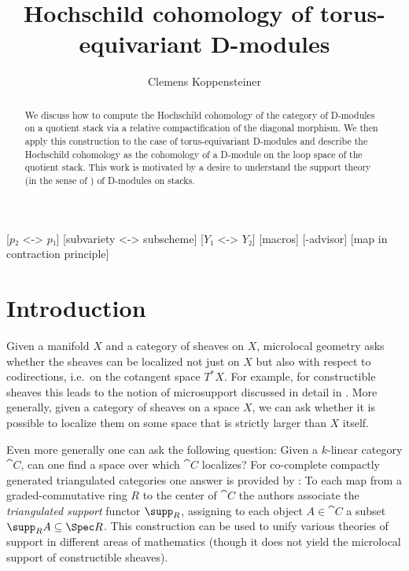 \documentclass[english]{ck-article}
\title{Hochschild cohomology of torus-equivariant D-modules}
\author{Clemens Koppensteiner}
\let\bar\overline
\newcommand\schemei{i'}
\newcommand\schemej{j'}
\newcommand\schemeq{q'}
\newcommand\schemebarq{\bar{q}'}
\newcommand\dropprimes{%
    \renewcommand\schemei{i}%
    \renewcommand\schemej{j}%
    \renewcommand\schemeq{q}%
    \renewcommand\schemebarq{\bar{q}}%
}
\begin{document}
\maketitle

[$p₂$ <-> $p₁$]
[subvariety <-> subscheme]
[$Y₁$ <-> $Y₂$]
\dropprimes%
[macros]
[-advisor]
[map in contraction principle]

\begin{abstract}
    We discuss how to compute the Hochschild cohomology of the category of D-modules on a quotient stack via a relative compactification of the diagonal morphism.
    We then apply this construction to the case of torus-equivariant D-modules and describe the Hochschild cohomology as the cohomology of a D-module on the loop space of the quotient stack.
    This work is motivated by a desire to understand the support theory (in the sense of \cite{BensonIyengarKrause:2008:LocalCohomologyAndSupportForTriangulatedCategories}) of D-modules on stacks.
\end{abstract}

\setcounter{tocdepth}{1}
\tableofcontents

\section{Introduction}

Given a manifold $X$ and a category of sheaves on $X$, microlocal geometry asks whether the sheaves can be localized not just on $X$ but also with respect to codirections, i.e.~on the cotangent space $T^*X$.
For example, for constructible sheaves this leads to the notion of microsupport discussed in detail in \cite{KashiwaraSchapira:1994:SheavesOnManifolds}.
More generally, given a category of sheaves on a space $X$, we can ask whether it is possible to localize them on some space that is strictly larger than $X$ itself.

Even more generally one can ask the following question: Given a $k$-linear category $\cat C$, can one find a space over which $\cat C$ localizes?
For co-complete compactly generated triangulated categories one answer is provided by \cite{BensonIyengarKrause:2008:LocalCohomologyAndSupportForTriangulatedCategories}:
To each map from a graded-commutative ring $R$ to the center of $\cat C$ the authors associate the \emph{triangulated support} functor $\supp_R$, assigning to each object $A ∈ \cat C$ a subset $\supp_R A \subseteq \Spec R$.
This construction can be used to unify various theories of support in different areas of mathematics (though it does not yield the microlocal support of constructible sheaves).
\end{document}
